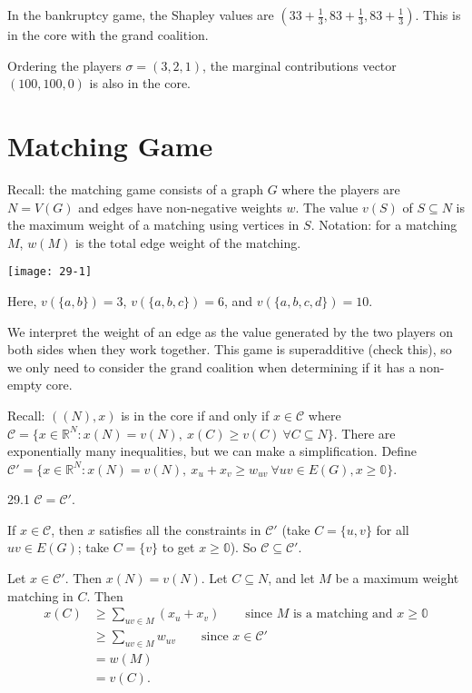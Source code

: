\documentclass[12pt,letterpaper]{report}
\begin{document}
\begin{ex}
  In the bankruptcy game, the Shapley values are
  $(33 + \frac{1}{3}, 83 + \frac{1}{3}, 83 + \frac{1}{3})$.
  This is in the core with the grand coalition.

  Ordering the players $\sigma = (3, 2, 1)$, the marginal contributions vector $(100, 100, 0)$ is
  also in the core.
\end{ex}

\section{Matching Game}

Recall: the matching game consists of a graph $G$ where the players are $N = V(G)$ and edges have
non-negative weights $w$.
The value $v(S)$ of $S \subseteq N$ is the maximum weight of a matching using vertices in $S$.
Notation: for a matching $M$, $w(M)$ is the total edge weight of the matching.

\begin{ex}
  \begin{center}
    \texttt{[image: 29-1]}
  \end{center}

  Here, $v(\{a, b\}) = 3$, $v(\{a, b, c\}) = 6$, and $v(\{a, b, c, d\}) = 10$.
\end{ex}

We interpret the weight of an edge as the value generated by the two players on both sides when they
work together.
This game is superadditive (check this), so we only need to consider the grand coalition when
determining if it has a non-empty core.

Recall: $((N), x)$ is in the core if and only if $x \in \mathcal{C}$ where
$\mathcal{C} = \{ x \in \mathbb{R}^N : x(N) = v(N), \ x(C) \geq v(C) \ \forall C \subseteq N \}$.
There are exponentially many inequalities, but we can make a simplification.
Define $\mathcal{C}' = \{ x \in \mathbb{R}^N : x(N) = v(N), \ x_u + x_v \geq w_{uv}
\ \forall uv \in E(G), x \geq \mathbb{0} \}$.

\begin{prop}{}{29.1}
  $\mathcal{C} = \mathcal{C'}$.
\end{prop}

\begin{thmproof}
  If $x \in \mathcal{C}$, then $x$ satisfies all the constraints in $\mathcal{C}'$ (take
  $C = \{u, v\}$ for all $uv \in E(G)$; take $C = \{v\}$ to get $x \geq \mathbb{0}$).
  So $\mathcal{C} \subseteq \mathcal{C}'$.

  Let $x \in \mathcal{C'}$.
  Then $x(N) = v(N)$.
  Let $C \subseteq N$, and let $M$ be a maximum weight matching in $C$.
  Then
  \begin{align*}
    x(C) &\geq \sum_{uv \in M} (x_u + x_v)
      \qquad \text{since $M$ is a matching and $x \geq \mathbb{0}$} \\
    &\geq \sum_{uv \in M} w_{uv} \qquad \text{since $x \in \mathcal{C}'$} \\
    &= w(M) \\
    &= v(C).
  \end{align*}
\end{thmproof}
\end{document}
